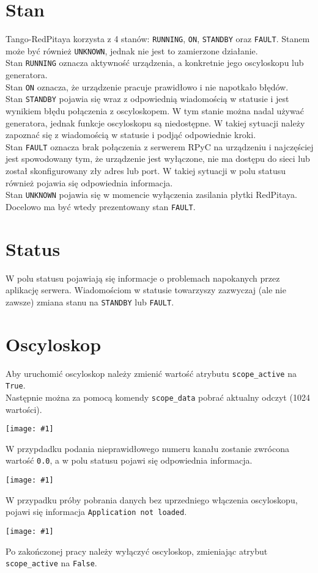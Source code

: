\documentclass[12pt,a4paper]{article}
\newcommand{\screenshot}[1]{\begin{minipage}[c]{\textwidth}\texttt{[image: \#1]}\end{minipage}}
\begin{document}
	\section{Stan}
	Tango-RedPitaya korzysta z 4 stanów: \texttt{RUNNING}, \texttt{ON}, \texttt{STANDBY} oraz \texttt{FAULT}.
	Stanem może być również \texttt{UNKNOWN}, jednak nie jest to zamierzone działanie.\\
	Stan \texttt{RUNNING} oznacza aktywność urządzenia, a konkretnie jego oscyloskopu lub generatora.\\
	Stan \texttt{ON} oznacza, że urządzenie pracuje prawidłowo i nie napotkało błędów.\\
	Stan \texttt{STANDBY} pojawia się wraz z odpowiednią wiadomością w statusie i jest wynikiem błędu połączenia z oscyloskopem.
	W tym stanie można nadal używać generatora, jednak funkcje oscyloskopu są niedostępne. W takiej sytuacji należy zapoznać się z wiadomością w statusie i podjąć odpowiednie kroki.\\
	Stan \texttt{FAULT} oznacza brak połączenia z serwerem RPyC na urządzeniu i najczęściej jest spowodowany tym, że urządzenie jest wyłączone, nie ma dostępu do sieci lub został skonfigurowany zły adres lub port. W takiej sytuacji w polu statusu również pojawia się odpowiednia informacja.\\
	Stan \texttt{UNKNOWN} pojawia się w momencie wyłączenia zasilania płytki RedPitaya. Docelowo ma być wtedy prezentowany stan \texttt{FAULT}.

	\section{Status}
	W polu statusu pojawiają się informacje o problemach napokanych przez aplikację serwera. Wiadomościom w statusie towarzyszy zazwyczaj (ale nie zawsze) zmiana stanu na \texttt{STANDBY} lub \texttt{FAULT}.\\

	\section{Oscyloskop}
	Aby uruchomić oscyloskop należy zmienić wartość atrybutu \texttt{scope\_active} na \texttt{True}.\\
	Następnie można za pomocą komendy \texttt{scope\_data} pobrać aktualny odczyt (1024 wartości).\\
	\screenshot{screenshots/scope_data.png}
	W przypdadku podania nieprawidłowego numeru kanału zostanie zwrócona wartość \texttt{0.0}, a w polu statusu pojawi się odpowiednia informacja.\\
	\screenshot{screenshots/invalid_scope_channel.png}
	W przypadku próby pobrania danych bez uprzedniego włączenia oscyloskopu, pojawi się informacja \texttt{Application not loaded}.\\
	\screenshot{screenshots/scope_inactive.png}
	Po zakończonej pracy należy wyłączyć oscyloskop, zmieniając atrybut \texttt{scope\_active} na \texttt{False}.
\end{document}
